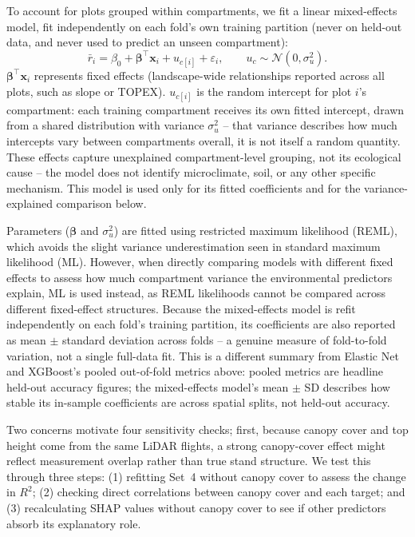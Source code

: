 To account for plots grouped within compartments, we fit a linear mixed-effects model, fit independently on each fold's own training partition (never on held-out data, and never used to predict an unseen compartment):
\begin{equation}
\bar{r}_i = \beta_0 + \boldsymbol{\beta}^{\top}\mathbf{x}_i + u_{c[i]} + \varepsilon_i, \qquad u_c \sim \mathcal{N}(0, \sigma_u^2).
\label{eq:mixed-effects}
\end{equation}
$\boldsymbol{\beta}^{\top}\mathbf{x}_i$ represents fixed effects (landscape-wide relationships reported across all plots, such as slope or TOPEX). $u_{c[i]}$ is the random intercept for plot $i$'s compartment: each training compartment receives its own fitted intercept, drawn from a shared distribution with variance $\sigma_u^2$ -- that variance describes how much intercepts vary between compartments overall, it is not itself a random quantity. These effects capture unexplained compartment-level grouping, not its ecological cause -- the model does not identify microclimate, soil, or any other specific mechanism. This model is used only for its fitted coefficients and for the variance-explained comparison below.

Parameters ($\boldsymbol{\beta}$ and $\sigma_u^2$) are fitted using restricted maximum likelihood (REML), which avoids the slight variance underestimation seen in standard maximum likelihood (ML). However, when directly comparing models with different fixed effects to assess how much compartment variance the environmental predictors explain, ML is used instead, as REML likelihoods cannot be compared across different fixed-effect structures. Because the mixed-effects model is refit independently on each fold's training partition, its coefficients are also reported as mean $\pm$ standard deviation across folds -- a genuine measure of fold-to-fold variation, not a single full-data fit. This is a different summary from Elastic Net and XGBoost's pooled out-of-fold metrics above: pooled metrics are headline held-out accuracy figures; the mixed-effects model's mean $\pm$ SD describes how stable its in-sample coefficients are across spatial splits, not held-out accuracy.

Two concerns motivate four sensitivity checks; first, because canopy cover and top height come from the same LiDAR flights, a strong canopy-cover effect might reflect measurement overlap rather than true stand structure. We test this through three steps: (1) refitting Set~4 without canopy cover to assess the change in $R^2$; (2) checking direct correlations between canopy cover and each target; and (3) recalculating SHAP values without canopy cover to see if other predictors absorb its explanatory role.

